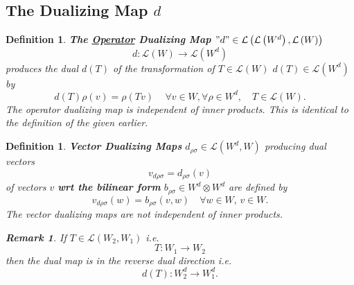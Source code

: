 \documentclass[aps,preprint]{revtex4}
\newtheorem{definition}[theorem]{Definition}
\newtheorem{remark}[theorem]{Remark}
\begin{document}
\subsection{The Dualizing Map $d$}

\begin{definition}
\textbf{The \underline{\textbf{Operator}} Dualizing Map \label{The operator
dualizing map} }$"d"\in \mathcal{L}\left( \mathcal{L}\left( W^{d}\right) ,%
\mathcal{L}\left( W\right) \right) $ 
\begin{equation}
d:\mathcal{L}\left( W\right) \rightarrow \mathcal{L}\left( W^{d}\right)
\end{equation}%
produces the dual $d\left( T\right) $ of the transformation of $T\in 
\mathcal{L}\left( W\right) $ \label{The dual transformation} $d\left(
T\right) \in \mathcal{L}\left( W^{d}\right) $ by 
\begin{equation}
d\left( T\right) \rho \left( v\right) =\rho \left( Tv\right) \,\quad \forall
v\in W,\forall \rho \in W^{d},\quad T\in \mathcal{L}\left( W\right) .
\end{equation}%
The operator dualizing map is independent of inner products. This is
identical to the definition of the 
given earlier.
\end{definition}

\begin{definition}
\textbf{Vector Dualizing Maps} \label{Vector Dualizing Maps} $d_{\rho \sigma
}\in \mathcal{L}\left( W^{d},W\right) $ producing dual vectors 
\begin{equation}
v_{d\rho \sigma }=d_{\rho \sigma }\left( v\right)
\end{equation}%
of vectors $v$ \textbf{wrt the bilinear form} $b_{\rho \sigma }\in
W^{d}\otimes W^{d}$ are defined by 
\begin{equation}
v_{d\rho \sigma }\left( w\right) =b_{\rho \sigma }\left( v,w\right) \quad
\forall w\in W,\,v\in W.
\end{equation}%
The vector dualizing maps are not independent of inner products.

\begin{remark}
If $T\in \mathcal{L}\left( W_{2},W_{1}\right) $ i.e. 
\begin{equation}
T:W_{1}\rightarrow W_{2}
\end{equation}%
then the dual map is in the reverse dual direction i.e. 
\begin{equation}
d\left( T\right) :W_{2}^{d}\rightarrow W_{1}^{d}.
\end{equation}
\end{remark}
\end{definition}
\end{document}
